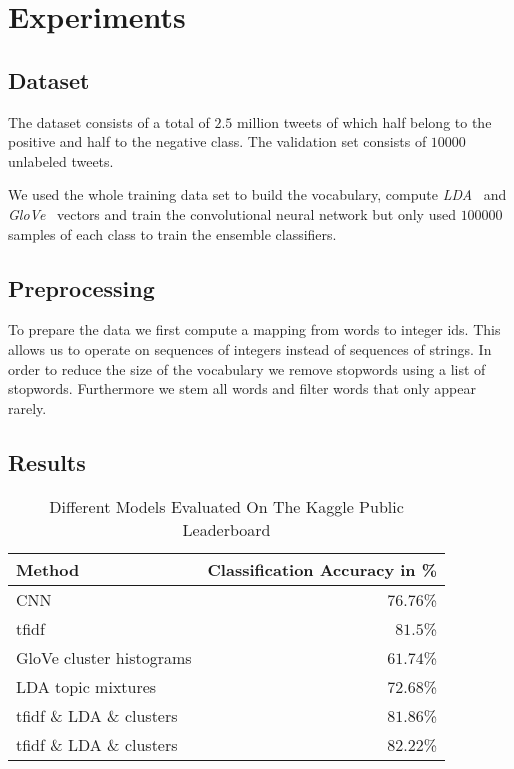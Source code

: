 
\section{Experiments}

\subsection{Dataset}

The dataset consists of a total of $2.5$ million tweets of which half belong to
the positive and half to the negative class. The validation set consists of
$10000$ unlabeled tweets.

We used the whole training data set to build the
vocabulary, compute \textit{LDA}~\cite{LDA} and \textit{GloVe}~\cite{glove} vectors and train the 
convolutional neural network but only used $100000$ samples of each class to
train the ensemble classifiers.

\subsection{Preprocessing}

To prepare the data we first compute a mapping from words to integer ids. This
allows us to operate on sequences of integers instead of sequences of strings.
In order to reduce the size of the vocabulary we remove stopwords using a list
of stopwords. Furthermore we stem all words and filter words that only appear
rarely.

\subsection{Results}

\begin{table}[h]
    \centering
    \begin{tabular}{l r}
        Method & Classification Accuracy in \% \\
        \hline
        CNN & $76.76$\% \\
        tfidf & $81.5$\% \\
        GloVe cluster histograms & $61.74$\% \\
        LDA topic mixtures & $72.68$\% \\
        tfidf \& LDA \& clusters & $81.86$\% \\
        tfidf \& LDA \& clusters\footnotemark{} & $82.22$\% \\
    \end{tabular}
    \caption{Different Models Evaluated On The Kaggle Public Leaderboard}\label{tab:res}
\end{table}

